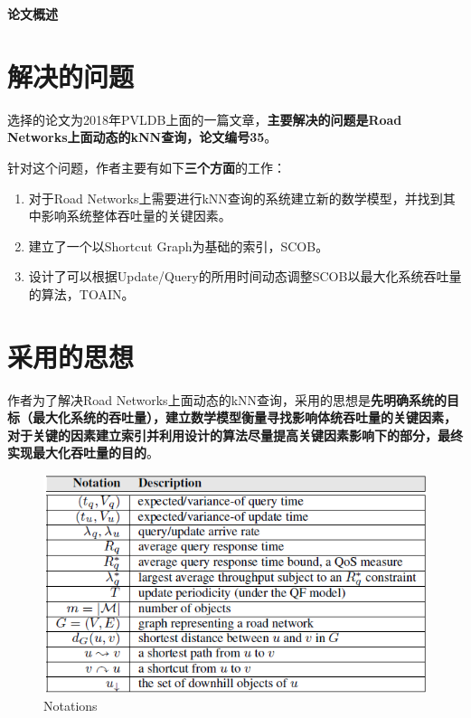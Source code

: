 \documentclass{ML}
\begin{document}
\maketitle

\tableofcontents
\newpage

\begin{center}
    \textbf{ 论文概述}
\end{center}

\section{解决的问题}
选择的论文\cite{toain}为2018年PVLDB上面的一篇文章，\textbf{主要解决的问题是Road Networks上面动态的kNN查询，论文编号35}。

针对这个问题，作者主要有如下\textbf{三个方面}的工作：
\begin{enumerate}
    \item 对于Road Networks上需要进行kNN查询的系统建立新的数学模型，并找到其中影响系统整体吞吐量的关键因素。
    \item 建立了一个以Shortcut Graph为基础的索引，SCOB。
    \item 设计了可以根据Update/Query的所用时间动态调整SCOB以最大化系统吞吐量的算法，TOAIN。
\end{enumerate}
\section{采用的思想}
作者为了解决Road Networks上面动态的kNN查询，采用的思想是\textbf{先明确系统的目标（最大化系统的吞吐量），建立数学模型衡量寻找影响体统吞吐量的关键因素，对于关键的因素建立索引并利用设计的算法尽量提高关键因素影响下的部分，最终实现最大化吞吐量的目的}。

\begin{figure}[htb]
	\centering
	\includegraphics[width=0.8\linewidth]{media/notations.png}
	\caption{Notations}\label{fig:notations}
\end{figure}
\end{document}
